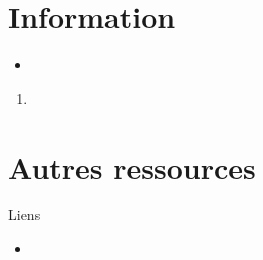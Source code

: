 \section{Information}

\begin{distributions}[Objectives]
\begin{itemize}
	\item	
\end{itemize}
\end{distributions}

\begin{outcomes}
\begin{enumerate}
	\item	
\end{enumerate}
\end{outcomes}

\clearpage

\section{Autres ressources}
\begin{FORMULA_SUMM}{Liens}
\begin{itemize}
	\item	
\end{itemize}
\end{FORMULA_SUMM}